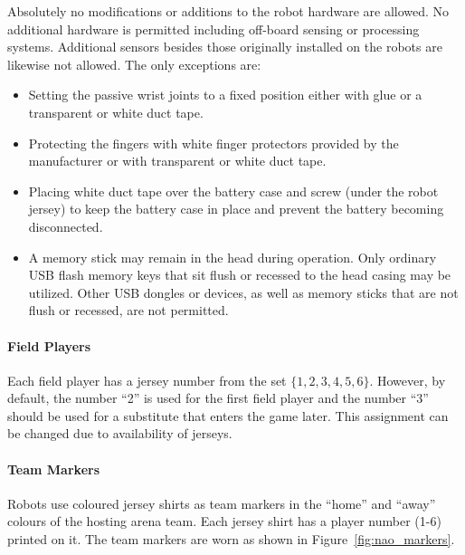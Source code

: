 Absolutely no modifications or additions to the robot hardware are allowed. No additional hardware is permitted including off-board sensing or processing systems. Additional sensors besides those originally installed on the robots are likewise not allowed. The only exceptions are:
\begin{itemize}
	\item Setting the passive wrist joints to a fixed position either with glue or a transparent or white duct tape.
	\item Protecting the fingers with white finger protectors provided by the manufacturer or with transparent or white duct tape.
	\item Placing white duct tape over the battery case and screw (under the robot jersey) to keep the battery case in place and prevent the battery becoming disconnected.
	\item A memory stick may remain in the head during operation.  Only ordinary USB flash memory keys that sit flush or recessed to the head casing may be utilized. Other USB dongles or devices, as well as memory sticks that are not flush or recessed, are not permitted.
\end{itemize}

\paragraph{Field Players}
\label{sec:field_players}
Each field player has a jersey number from the set $\{1, 2, 3, 4, 5, 6\}$. However, by default, the number ``2'' is used for the first field player and the number ``3'' should be used for a substitute that enters the game later. This assignment can be changed due to availability of jerseys.

\paragraph{Team Markers}
\label{sec:team_markers}
Robots use coloured jersey shirts as team markers in the ``home'' and ``away'' colours of the hosting arena team. Each jersey shirt has a player number (1-6) printed on it. The team markers are worn as shown in Figure~\ref{fig:nao_markers}.

